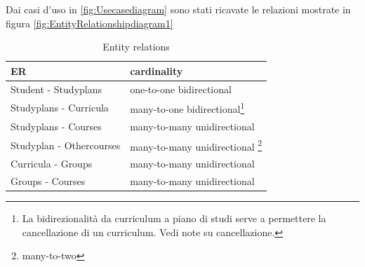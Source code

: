 \documentclass{article}
\begin{document}
Dai casi d'uso in \ref{fig:Usecasediagram} sono stati ricavate le relazioni mostrate in figura \ref{fig:EntityRelationshipdiagram1}
\begin{table}[!h]
  \begin{center}
    \caption{Entity relations}
    \label{tab:Entity Relationship}
    \begin{tabular}{l|l} %
      \textbf{ER} & \textbf{cardinality}  \\ 
      \hline
		Student - Studyplans & one-to-one bidirectional \\
		Studyplans - Curricula & many-to-one bidirectional\footnote{La bidirezionalità da curriculum a piano di studi serve a permettere la cancellazione di un curriculum. Vedi note su cancellazione. } \\
		Studyplans - Courses  & many-to-many unidirectional \\
		Studyplan - Othercourses & many-to-many unidirectional \footnote{many-to-two} \\
		Curricula - Groups & many-to-many unidirectional \\
		Groups - Courses & many-to-many unidirectional \\
    \end{tabular}
  \end{center}
\end{table}
\end{document}
